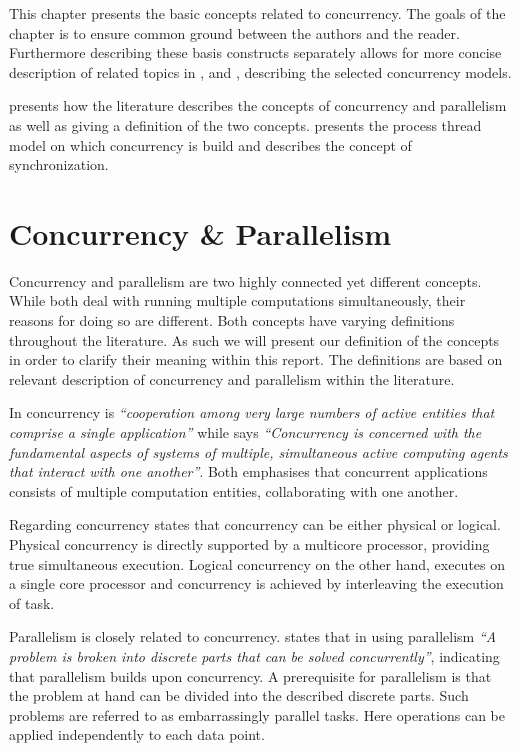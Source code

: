 \makeatletter {}\makeatother
{}
This chapter presents the basic concepts related to concurrency. The goals of the chapter is to ensure common ground between the authors and the reader. Furthermore describing these basis constructs separately allows for more concise description of related topics in ,  and , describing the selected concurrency models. 

 presents how the literature describes the concepts of concurrency and parallelism as well as giving a definition of the two concepts.  presents the process thread model on which concurrency is build and  describes the concept of synchronization.
\section{Concurrency \& Parallelism}\label{sec:concurrency_parallelism}
Concurrency and parallelism are two highly connected yet different concepts. While both deal with running multiple computations simultaneously, their reasons for doing so are different. Both concepts have varying definitions throughout the literature. As such we will present our definition of the concepts in order to clarify their meaning within this report. The definitions are based on relevant description of concurrency and parallelism within the literature.

In \cite[p. 330]{papadopoulos1998coordination} concurrency is \textit{``cooperation among very large numbers of active entities that comprise a single application''} while \cite[p. 607]{cleaveland1996strategic}
says \textit{``Concurrency is concerned with the fundamental aspects of systems of multiple, simultaneous active computing agents that interact with one another''}. Both emphasises that concurrent applications consists of multiple computation entities, collaborating with one another.

Regarding concurrency \cite[p. 579]{sebestaProLang} states that concurrency can be either physical or logical. Physical concurrency is directly supported by a multicore processor, providing true simultaneous execution. Logical concurrency on the other hand, executes on a single core processor and concurrency is achieved by interleaving the execution of task.

Parallelism is closely related to concurrency. \cite{introPar} states that in using parallelism \textit{``A problem is broken into discrete parts that can be solved concurrently''}, indicating that parallelism builds upon concurrency. A prerequisite for parallelism is that the problem at hand can be divided into the described discrete parts. Such problems are referred to as embarrassingly parallel tasks\cite{sutter2005software}. Here operations can be applied independently to each data point.

